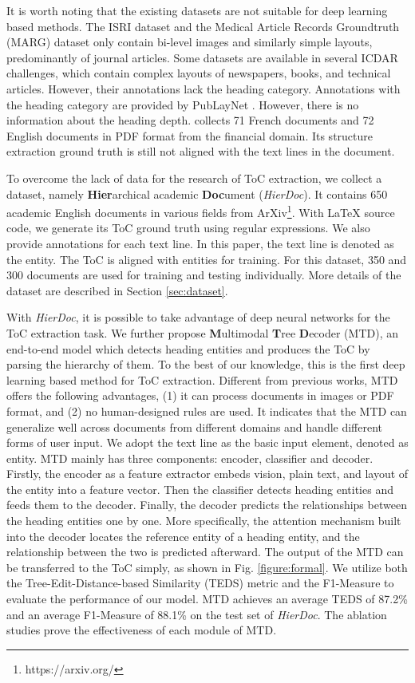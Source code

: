 \documentclass[a4paper,conference]{IEEEtran}
\begin{document}
It is worth noting that the existing datasets are not suitable for deep learning based methods. The ISRI dataset \cite{isri} and the Medical Article Records Groundtruth (MARG) dataset \cite{marg} only contain bi-level images and similarly simple layouts, predominantly of journal articles. Some datasets \cite{2015icdar} \cite{2017icdar} \cite{2009icdar} are available in several ICDAR challenges, which contain complex layouts of newspapers, books, and technical articles. However, their annotations lack the heading category. Annotations with the heading category are provided by PubLayNet \cite{publaynet}. However, there is no information about the heading depth. \cite{data:fin} collects 71 French documents and 72 English documents in PDF format from the financial domain. Its structure extraction ground truth is still not aligned with the text lines in the document.

To overcome the lack of data for the research of ToC extraction, we collect a dataset, namely \textbf{Hier}archical academic \textbf{Doc}ument (\textit{HierDoc}). It contains 650 academic English documents in various fields from ArXiv\footnote{https://arxiv.org/}. With LaTeX source code, we generate its ToC ground truth using regular expressions. We also provide annotations for each text line. In this paper, the text line is denoted as the entity. The ToC is aligned with entities for training. For this dataset, 350 and 300 documents are used for training and testing individually. More details of the dataset are described in Section \ref{sec:dataset}.

With \textit{HierDoc}, it is possible to take advantage of deep neural networks for the ToC extraction task. We further propose \textbf{M}ultimodal \textbf{T}ree \textbf{D}ecoder (MTD), an end-to-end model which detects heading entities and produces the ToC by parsing the hierarchy of them. To the best of our knowledge, this is the first deep learning based method for ToC extraction. Different from previous works, MTD offers the following advantages, (1) it can process documents in images or PDF format, and (2) no human-designed rules are used. It indicates that the MTD can generalize well across documents from different domains and handle different forms of user input. We adopt the text line as the basic input element, denoted as entity. MTD mainly has three components: encoder, classifier and decoder. Firstly, the encoder as a feature extractor embeds vision, plain text, and layout of the entity into a feature vector. Then the classifier detects heading entities and feeds them to the decoder. Finally, the decoder predicts the relationships between the heading entities one by one. More specifically, the attention mechanism built into the decoder locates the reference entity of a heading entity, and the relationship between the two is predicted afterward. The output of the MTD can be transferred to the ToC simply, as shown in Fig. \ref{figure:formal}. We utilize both the Tree-Edit-Distance-based Similarity (TEDS)\cite{teds} metric and the F1-Measure to evaluate the performance of our model. MTD achieves an average TEDS of 87.2\% and an average F1-Measure of 88.1\% on the test set of \textit{HierDoc}. The ablation studies prove the effectiveness of each module of MTD.
\end{document}
